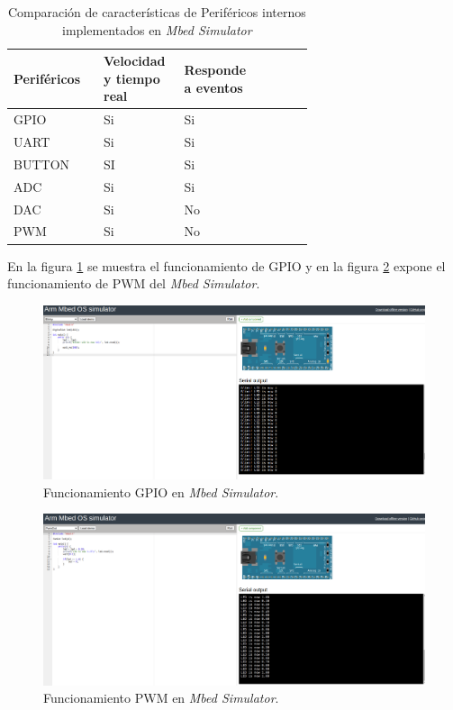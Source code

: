 \begin{table}[h]
\centering
\caption[Comparación de características de periféricos internos implementados en \textit{Mbed Simulator}]{Comparación de características de Periféricos internos implementados en \textit{Mbed Simulator}}
\begin{tabular}{p{0.24\linewidth} p{0.14\linewidth}  p{0.14\linewidth}  p{0.14\linewidth}}
\toprule
\textbf{Periféricos} 
& \textbf{Velocidad y tiempo real}
& \textbf{Responde a eventos}
\\
\midrule
GPIO & Si & Si  \\
UART & Si & Si \\
BUTTON & SI & Si \\
ADC & Si & Si \\
DAC & Si & No \\
PWM & Si & No \\ 
\bottomrule
\hline
\end{tabular}
\label{tab:perifericosInternosMBED}
\end{table}


En la figura \ref{fig:GPIOMbed} se muestra el funcionamiento de GPIO y en la figura \ref{fig:PMWMbed} expone el funcionamiento de PWM del \textit{Mbed Simulator}.


\hfill \break
\hfill \break
\hfill \break
\hfill \break
\hfill \break
\hfill \break
\hfill \break
\hfill \break
\hfill \break
\hfill \break

\begin{figure}[ht]
	\centering
	\includegraphics[scale=.28]{./Figures/GPIOMbed.png}
	\caption{Funcionamiento GPIO en \textit{Mbed Simulator}.}
	\label{fig:GPIOMbed}
\end{figure}



\begin{figure}[ht]
	\centering
	\includegraphics[scale=.28]{./Figures/PMWMbed.png}
	\caption{Funcionamiento PWM en \textit{Mbed Simulator}.}
	\label{fig:PMWMbed}
\end{figure}





